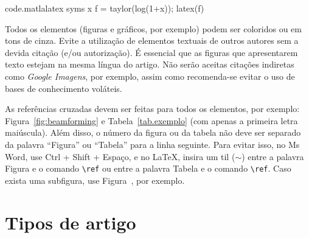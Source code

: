 \documentclass[12pt, a4paper, twoside, twocolumn]{article}
\begin{document}
\begin{matlabcode}{code.matlalatex}
  syms x
  f = taylor(log(1+x));
  latex(f)
\end{matlabcode}

Todos os elementos (figuras e gráficos, por exemplo) podem ser coloridos ou em tons de cinza. Evite a utilização de elementos textuais de outros autores sem a devida citação (e/ou autorização). É essencial que as figuras que apresentarem texto estejam na mesma língua do artigo. Não serão aceitas citações indiretas como \textit{Google Imagens}, por exemplo, assim como recomenda-se evitar o uso de bases de conhecimento voláteis.

 \enlargethispage{2mm}

As referências cruzadas devem ser feitas para todos os elementos, por exemplo: Figura~\ref{fig:beamforming} e Tabela~\ref{tab.exemplo} (com apenas a primeira letra maiúscula). Além disso, o número da figura ou da tabela não deve ser separado da palavra ``Figura'' ou ``Tabela'' para a linha seguinte. Para evitar isso, no Ms Word, use Ctrl + Shift + Espaço, e no \LaTeX, insira um til ($\sim$) entre a palavra Figura e o comando \verb=\ref= ou entre a palavra Tabela e o comando \verb=\ref=. Caso exista uma subfigura, use Figura~, por exemplo.


\section{Tipos de artigo}
\end{document}
